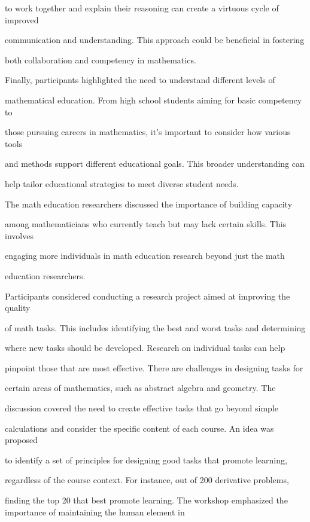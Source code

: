 \documentclass[11pt]{article}
\begin{document}
to work together and explain their reasoning can create a virtuous cycle of improved

communication and understanding. This approach could be beneficial in fostering

both collaboration and competency in mathematics.

Finally, participants highlighted the need to understand different levels of

mathematical education. From high school students aiming for basic competency to

those pursuing careers in mathematics, it's important to consider how various tools

and methods support different educational goals. This broader understanding can

help tailor educational strategies to meet diverse student needs.

The math education researchers discussed the importance of building capacity

among mathematicians who currently teach but may lack certain skills. This involves

engaging more individuals in math education research beyond just the math

education researchers.

Participants considered conducting a research project aimed at improving the quality

of math tasks. This includes identifying the best and worst tasks and determining

where new tasks should be developed. Research on individual tasks can help

pinpoint those that are most effective. There are challenges in designing tasks for

certain areas of mathematics, such as abstract algebra and geometry. The

discussion covered the need to create effective tasks that go beyond simple

calculations and consider the specific content of each course. An idea was proposed

to identify a set of principles for designing good tasks that promote learning,

regardless of the course context. For instance, out of 200 derivative problems,

finding the top 20 that best promote learning. The workshop emphasized the importance of maintaining the human element in
\end{document}
